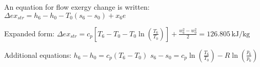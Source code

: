 An equation for flow exergy change is written:  
\( \Delta ex_{str} = h_6 - h_0 - T_0 (s_6 - s_0) + x_6 e \)  

Expanded form:  
\( \Delta ex_{str} = c_p [T_6 - T_0 - T_0 \ln (\frac{T_6}{T_0})] + \frac{w_6^2 - w_0^2}{2} = 126.805 \, \text{kJ/kg} \)  

Additional equations:  
\( h_6 - h_0 = c_p (T_6 - T_0) \)  
\( s_6 - s_0 = c_p \ln (\frac{T_6}{T_0}) - R \ln (\frac{p_6}{p_0}) \)